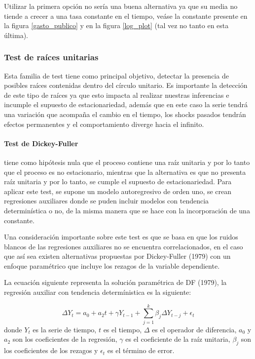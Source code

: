 \documentclass[
  12pt,
]{article}
\begin{document}
Utilizar la primera opción no sería una buena alternativa ya que su
media no tiende a crecer a una tasa constante en el tiempo, veáse la
constante presente en la figura \ref{gasto_publico} y en la figura
\ref{log_plot} (tal vez no tanto en esta última).

\hypertarget{test-de-rauxedces-unitarias}{%
\subsubsection{Test de raíces
unitarias}\label{test-de-rauxedces-unitarias}}

Esta familia de test tiene como principal objetivo, detectar la
presencia de posibles raíces contenidas dentro del círculo unitario. Es
importante la detección de este tipo de raíces ya que esto impacta al
realizar nuestras inferencias e incumple el supuesto de estacionariedad,
además que en este caso la serie tendrá una variación que acompaña el
cambio en el tiempo, los shocks pasados tendrán efectos permanentes y el
comportamiento diverge hacia el infinito.

\hypertarget{test-de-dickey-fuller}{%
\paragraph{Test de Dickey-Fuller}\label{test-de-dickey-fuller}}

tiene como hipótesis nula que el proceso contiene una raíz unitaria y
por lo tanto que el proceso es no estacionario, mientras que la
alternativa es que no presenta raíz unitaria y por lo tanto, se cumple
el supuesto de estacionariedad. Para aplicar este test, se supone un
modelo autoregresivo de orden uno, se crean regresiones auxiliares donde
se puden incluir modelos con tendencia determinística o no, de la misma
manera que se hace con la incorporación de una constante.

Una consideración importante sobre este test es que se basa en que los
ruidos blancos de las regresiones auxiliares no se encuentra
correlacionados, en el caso que así sea existen alternativas propuestas
por Dickey-Fuller (1979) con un enfoque paramétrico que incluye los
rezagos de la variable dependiente.

La ecuación siguiente representa la solución paramétrica de DF (1979),
la regresión auxiliar con tendencia determínistica es la siguiente:

\[ \Delta Y_t = a_0 + a_2 t + \gamma Y_{t-1} + \sum_{j=1}^{k} \beta_j \Delta Y_{t-j} + \epsilon_t \]
donde \(Y_t\) es la serie de tiempo, \(t\) es el tiempo, \(\Delta\) es
el operador de diferencia, \(a_0\) y \(a_2\) son los coeficientes de la
regresión, \(\gamma\) es el coeficiente de la raíz unitaria, \(\beta_j\)
son los coeficientes de los rezagos y \(\epsilon_t\) es el término de
error.
\end{document}
